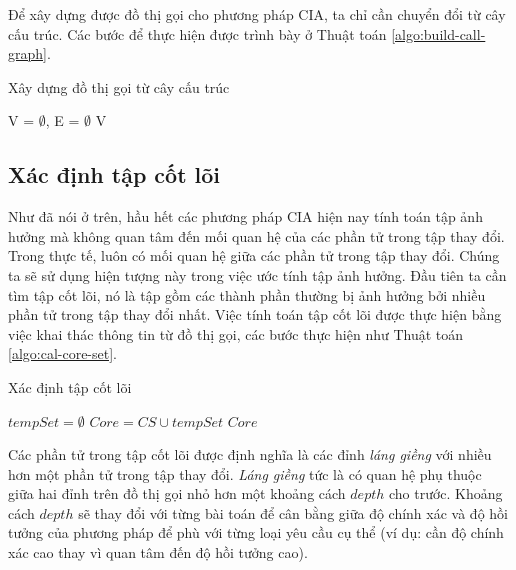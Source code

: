 \documentclass[12pt]{report}
\newenvironment{thuattoan}[1][h]
  {\renewcommand{\algorithmcfname}{Thuật toán}
   \begin{algorithm}[#1]
  }{\end{algorithm}}
\begin{document}
Để xây dựng được đồ thị gọi cho phương pháp CIA, ta chỉ cần chuyển đổi từ cây cấu trúc. Các bước để thực hiện được trình bày ở Thuật toán \ref{algo:build-call-graph}.

\begin{thuattoan}
	\label{algo:build-call-graph}
	\caption{Xây dựng đồ thị gọi từ cây cấu trúc}
	V = $\emptyset$, E = $\emptyset$\;
	\Return V\;
\end{thuattoan}

\subsection{Xác định tập cốt lõi}
Như đã nói ở trên, hầu hết các phương pháp CIA hiện nay tính toán tập ảnh hưởng mà không quan tâm đến mối quan hệ của các phần tử trong tập thay đổi. Trong thực tế, luôn có mối quan hệ giữa các phần tử trong tập thay đổi. Chúng ta sẽ sử dụng hiện tượng này trong việc ước tính tập ảnh hưởng. Đầu tiên ta cần tìm tập cốt lõi, nó là tập gồm các thành phần thường bị ảnh hưởng bởi nhiều phần tử trong tập thay đổi nhất. Việc tính toán tập cốt lõi được thực hiện bằng việc khai thác thông tin từ đồ thị gọi, các bước thực hiện như Thuật toán \ref{algo:cal-core-set}.

\begin{thuattoan}
	\label{algo:cal-core-set}
	\caption{Xác định tập cốt lõi}
	
	$tempSet = \emptyset$\;
	$Core = CS \cup tempSet$\;
	\Return $Core$\;
\end{thuattoan}

Các phần tử trong tập cốt lõi được định nghĩa là các đỉnh \textit{láng giềng} với nhiều hơn một phần tử trong tập thay đổi. \textit{Láng giềng} tức là có quan hệ phụ thuộc giữa hai đỉnh trên đồ thị gọi nhỏ hơn một khoảng cách $depth$ cho trước. Khoảng cách $depth$ sẽ thay đổi với từng bài toán để cân bằng giữa độ chính xác và độ hồi tưởng của phương pháp để phù với từng loại yêu cầu cụ thể (ví dụ: cần độ chính xác cao thay vì quan tâm đến độ hồi tưởng cao).
\end{document}
